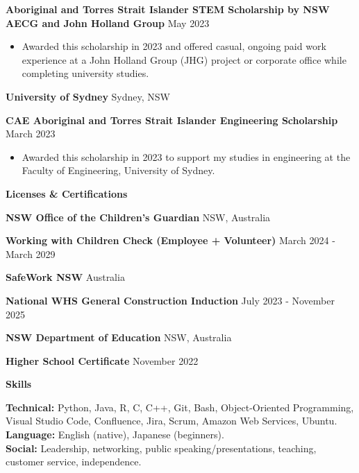 \documentclass[11pt]{article}
\begin{document}
\textbf{Aboriginal and Torres Strait Islander STEM Scholarship by NSW AECG and John Holland Group} \hfill May 2023
\begin{itemize}[noitemsep, topsep=0pt, partopsep=0pt, parsep=0pt]
    \item Awarded this scholarship in 2023 and offered casual, ongoing paid work experience at a John Holland Group (JHG) project or corporate office while completing university studies.
\end{itemize}

\vspace{12pt}

\textbf{University of Sydney} \hfill Sydney, NSW

\textbf{CAE Aboriginal and Torres Strait Islander Engineering Scholarship} \hfill March 2023
\begin{itemize}[noitemsep, topsep=0pt, partopsep=0pt, parsep=0pt]
    \item Awarded this scholarship in 2023 to support my studies in engineering at the Faculty of Engineering, University of Sydney.
\end{itemize}

\vspace{12pt}


\begin{center}
    \textbf{Licenses \& Certifications}\\
    \hrulefill
\end{center}

\textbf{NSW Office of the Children's Guardian} \hfill NSW, Australia

\textbf{Working with Children Check (Employee + Volunteer)} \hfill March 2024 - March 2029

\vspace{12pt}

\textbf{SafeWork NSW} \hfill Australia

\textbf{National WHS General Construction Induction} \hfill July 2023 - November 2025

\vspace{12pt}

\textbf{NSW Department of Education} \hfill NSW, Australia

\textbf{Higher School Certificate} \hfill November 2022

\vspace{12pt}


\begin{center}
    \textbf{Skills}\\
    \hrulefill
\end{center}

\textbf{Technical:} Python, Java, R, C, C++, Git, Bash, Object-Oriented Programming, Visual Studio Code, Confluence, Jira, Scrum, Amazon Web Services, Ubuntu.\\

\textbf{Language:} English (native), Japanese (beginners).\\

\textbf{Social:} Leadership, networking, public speaking/presentations, teaching, customer service, independence.
\end{document}
